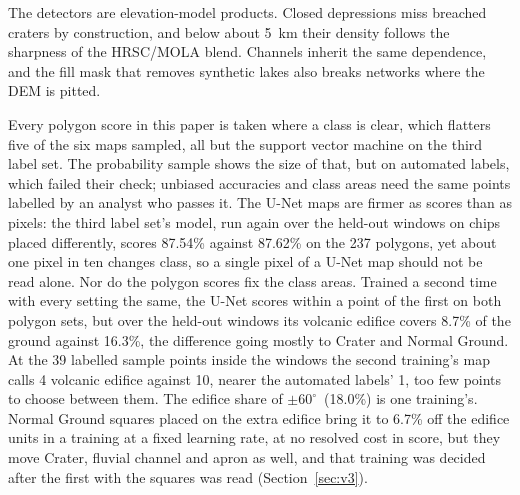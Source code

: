 \documentclass[twocolumn]{aastex701}
\newcommand{\pmsixty}{$\pm60^{\circ}$}
\begin{document}
The detectors are elevation-model products. Closed depressions miss breached craters by construction, and below about
5~km their density follows the sharpness of the HRSC/MOLA blend. Channels inherit the same dependence, and the fill
mask that removes synthetic lakes also breaks networks where the DEM is pitted.

Every polygon score in this paper is taken where a class is clear, which flatters five of the six maps sampled, all but
the support vector machine on the third label set. The probability sample shows the size of that, but on
automated labels, which failed their check; unbiased accuracies and class areas
need the same points labelled by an analyst who passes it. %
The U-Net maps are firmer as scores than as pixels: the third label set's model, run again over the held-out windows
on chips placed differently, scores 87.54\% against 87.62\% on the 237 polygons, yet about one pixel in ten changes
class, so a single pixel of a U-Net map should not be read alone. %
Nor do the polygon scores fix the class areas. Trained a second time with every setting the same, the U-Net scores
within a point of the first on both polygon sets, but over the held-out windows its volcanic edifice covers 8.7\% of
the ground against 16.3\%, the difference going mostly to Crater and Normal Ground. At the 39 labelled sample points
inside the windows the second training's map calls 4 volcanic edifice against 10, nearer the automated labels' 1, too
few points to choose between them. The edifice share of \pmsixty\ (18.0\%) is one training's. Normal Ground
squares placed on the extra edifice bring it to 6.7\% off the edifice units in a training at a fixed learning rate,
at no resolved cost in score, but they move Crater, fluvial channel and apron as well, and that training was decided
after the first with the squares was read (Section~\ref{sec:v3}). %
\end{document}

